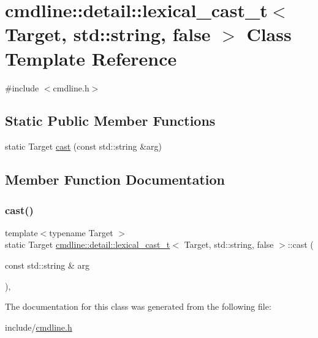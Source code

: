 \hypertarget{classcmdline_1_1detail_1_1lexical__cast__t_3_01_target_00_01std_1_1string_00_01false_01_4}{}\section{cmdline\+::detail\+::lexical\+\_\+cast\+\_\+t$<$ Target, std\+::string, false $>$ Class Template Reference}
\label{classcmdline_1_1detail_1_1lexical__cast__t_3_01_target_00_01std_1_1string_00_01false_01_4}


{\ttfamily \#include $<$cmdline.\+h$>$}

\subsection*{Static Public Member Functions}
\begin{DoxyCompactItemize}
\item 
static Target \mbox{\hyperlink{classcmdline_1_1detail_1_1lexical__cast__t_3_01_target_00_01std_1_1string_00_01false_01_4_a8612edb07ba3ba15be8615dcacbf58e3}{cast}} (const std\+::string \&arg)
\end{DoxyCompactItemize}


\subsection{Member Function Documentation}
\mbox{\label{classcmdline_1_1detail_1_1lexical__cast__t_3_01_target_00_01std_1_1string_00_01false_01_4_a8612edb07ba3ba15be8615dcacbf58e3}} 
\subsubsection{\texorpdfstring{cast()}{cast()}}
{\footnotesize\ttfamily template$<$typename Target $>$ \\
static Target \mbox{\hyperlink{classcmdline_1_1detail_1_1lexical__cast__t}{cmdline\+::detail\+::lexical\+\_\+cast\+\_\+t}}$<$ Target, std\+::string, false $>$\+::cast (\begin{DoxyParamCaption}\item[{const std\+::string \&}]{arg }\end{DoxyParamCaption})\hspace{0.3cm}{\ttfamily [inline]}, {\ttfamily [static]}}



The documentation for this class was generated from the following file\+:\begin{DoxyCompactItemize}
\item 
include/\mbox{\hyperlink{cmdline_8h}{cmdline.\+h}}\end{DoxyCompactItemize}
